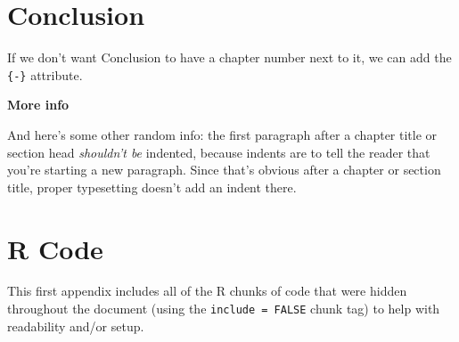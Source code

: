 \documentclass[12pt,oneside]{reedthesis}
\begin{document}
\hypertarget{conclusion}{%
\chapter*{Conclusion}\label{conclusion}}

If we don't want Conclusion to have a chapter number next to it, we can add the \texttt{\{-\}} attribute.

\textbf{More info}

And here's some other random info: the first paragraph after a chapter title or section head \emph{shouldn't be} indented, because indents are to tell the reader that you're starting a new paragraph. Since that's obvious after a chapter or section title, proper typesetting doesn't add an indent there.

\appendix

\hypertarget{r-code}{%
\chapter{R Code}\label{r-code}}

This first appendix includes all of the R chunks of code that were hidden throughout the document (using the \texttt{include\ =\ FALSE} chunk tag) to help with readability and/or setup.
\end{document}
